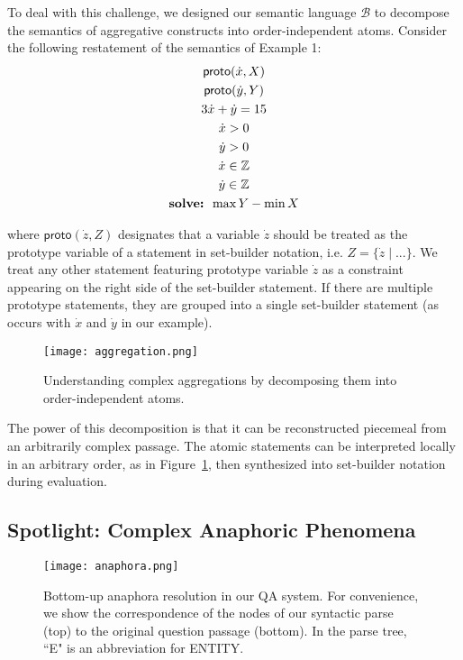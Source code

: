 \documentclass[11pt,letterpaper]{article}
\begin{document}
To deal with this challenge, we designed our semantic language $\mathcal{B}$ to decompose the semantics of aggregative constructs into order-independent atoms. Consider the following restatement of the semantics of Example 1:
\begin{gather*}
	\mathsf{proto}(\dot{x}, X) \\
	\mathsf{proto}(\dot{y}, Y) \\
	3\dot{x}+\dot{y}=15 \\
	\dot{x} > 0 \\
	\dot{y} > 0 \\
	\dot{x} \in \mathbb{Z} \\
	\dot{y} \in \mathbb{Z} \\
	\mbox{\textbf{solve: }} \max{Y} - \min{X}
\end{gather*}

\noindent where $\mathsf{proto}(\dot{z}, Z)$ designates that a variable $\dot{z}$ should be treated as the prototype variable of a statement in set-builder notation, i.e. $Z = \{\dot{z} \mid ...\}$. We treat any other statement featuring prototype variable $\dot{z}$ as a constraint appearing on the right side of the set-builder statement. If there are multiple prototype statements, they are grouped into a single set-builder statement (as occurs with $\dot{x}$ and $\dot{y}$ in our example).

\begin{figure}[tb]
\centering
\mbox{\texttt{[image: aggregation.png]}}
\caption{\label{fig:aggregation} Understanding complex aggregations by decomposing them into order-independent atoms.}
\end{figure}

The power of this decomposition is that it can be reconstructed piecemeal from an arbitrarily complex passage. The atomic statements can be interpreted locally in an arbitrary order, as in Figure~\ref{fig:aggregation}, then synthesized into set-builder notation during evaluation.

\subsection{Spotlight: Complex Anaphoric Phenomena\label{sec:anaphora}}

\begin{figure*}[tb]
\centering
\mbox{\texttt{[image: anaphora.png]}}
\caption{\label{fig:anaphora} Bottom-up anaphora resolution in our QA system. For convenience, we show the correspondence of the nodes of our syntactic parse (top) to the original question passage (bottom). In the parse tree, ``E" is an abbreviation for ENTITY.}
\end{figure*}
\end{document}
